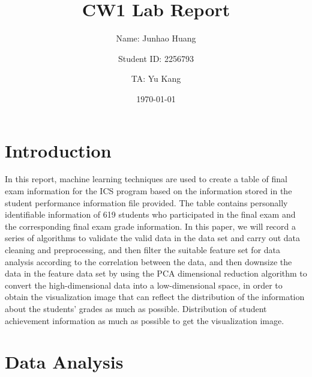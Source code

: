 \documentclass[twocolumn]{IEEEtran}
\title{CW1 Lab Report}
\author{Name: Junhao Huang \and Student ID: 2256793 \and TA: Yu Kang}
\date{\today}
\begin{document}

\maketitle

\section{Introduction}
In this report, machine learning techniques are used to create a table of final exam information for the ICS program based on the information stored in the student performance information file provided. The table contains personally identifiable information of 619 students who participated in the final exam and the corresponding final exam grade information. In this paper, we will record a series of algorithms to validate the valid data in the data set and carry out data cleaning and preprocessing, and then filter the suitable feature set for data analysis according to the correlation between the data, and then downsize the data in the feature data set by using the PCA dimensional reduction algorithm to convert the high-dimensional data into a low-dimensional space, in order to obtain the visualization image that can reflect the distribution of the information about the students' grades as much as possible. Distribution of student achievement information as much as possible to get the visualization image.

\section{Data Analysis}
\end{document}
